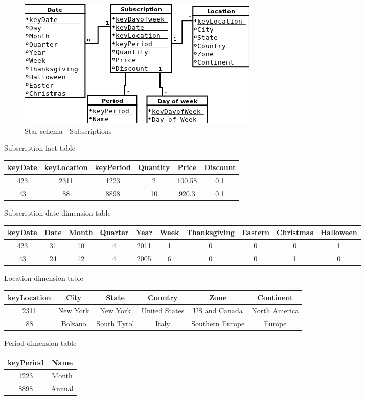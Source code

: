 \begin{figure}[!hbp]
    \includegraphics[scale=0.5]{schema_star_subscriptions}
\caption{\label{pic:st_sub}  Star schema - Subscriptions}
\end{figure}

Subscription fact table\\
\begin{tabular}{|c|c|c|c|c|c|}
\hline
keyDate & keyLocation & keyPeriod & Quantity & Price & Discount\\
\hline
423 & 2311 & 1223 & 2 & 100.58 & 0.1\\
43 & 88 & 8898 & 10 & 920.3 & 0.1\\
\hline
\end{tabular}

Subscription date dimension table\\
\begin{tabular}{|c|c|c|c|c|c|c|c|c|c|}
\hline
keyDate & Date & Month & Quarter & Year & Week & Thanksgiving & Eastern & Christmas & Halloween\\
\hline
423 & 31 & 10 & 4 & 2011 & 1 & 0 & 0 & 0 & 1\\
43 & 24 & 12 & 4 & 2005 & 6 & 0 & 0 & 1 & 0\\
\hline
\end{tabular}


Location dimension table\\
\begin{tabular}{|c|c|c|c|c|c|}
\hline
keyLocation & City & State & Country & Zone & Continent\\
\hline
2311 & New York & New York & United States & US and Canada & North America\\
88 & Bolzano & South Tyrol & Italy & Southern Europe & Europe\\
\hline
\end{tabular}

Period dimension table\\
\begin{tabular}{|c|c|}
\hline
keyPeriod & Name\\
\hline
1223 & Month\\
8898 & Annual\\
\hline
\end{tabular}


\clearpage
